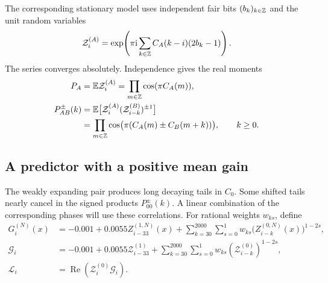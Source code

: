 The corresponding stationary model uses independent fair bits
\((b_k)_{k\in\mathbb Z}\) and the unit random variables
\begin{equation}
 \mathcal Z_i^{(A)}=
 \exp\!\left(\pi\mathrm i\sum_{k\in\mathbb Z}C_A(k-i)(2b_k-1)\right).
 \label{np:stationary}
\end{equation}
The series converges absolutely. Independence gives the real moments
\begin{equation}
 \begin{split}
 P_A&=\mathbb E\mathcal Z_i^{(A)}
       =\prod_{m\in\mathbb Z}\cos(\pi C_A(m)),\\
 P_{AB}^{\pm}(k)
   &=\mathbb E\bigl[\mathcal Z_i^{(A)}
                    (\mathcal Z_{i-k}^{(B)})^{\pm1}\bigr]\\
   &=\prod_{m\in\mathbb Z}\cos\bigl(\pi(C_A(m)\pm C_B(m+k))\bigr),
 \qquad k\ge0.
 \end{split}
 \label{np:scalar-products}
\end{equation}

\subsection{A predictor with a positive mean gain}
\label{np:predictor-section}

The weakly expanding pair produces long decaying tails in \(C_0\).
Some shifted tails nearly cancel in the signed products
\(P_{00}^{\pm}(k)\). A linear combination of the corresponding phases will
use these correlations. For rational weights \(w_{ks}\), define
\begin{equation}
 \begin{split}
 G_i^{(N)}(x)
  &=-0.001+0.0055 Z_{i-33}^{(1,N)}(x)
    +\sum_{k=30}^{2000}\sum_{s=0}^1
           w_{ks}\bigl(Z_{i-k}^{(0,N)}(x)\bigr)^{1-2s},\\
 \mathcal G_i
  &=-0.001+0.0055\mathcal Z_{i-33}^{(1)}
    +\sum_{k=30}^{2000}\sum_{s=0}^1
           w_{ks}(\mathcal Z_{i-k}^{(0)})^{1-2s},\\
 \mathcal L_i&=\operatorname{Re}(\mathcal Z_i^{(0)}\mathcal G_i).
 \end{split}
 \label{np:predictor}
\end{equation}

